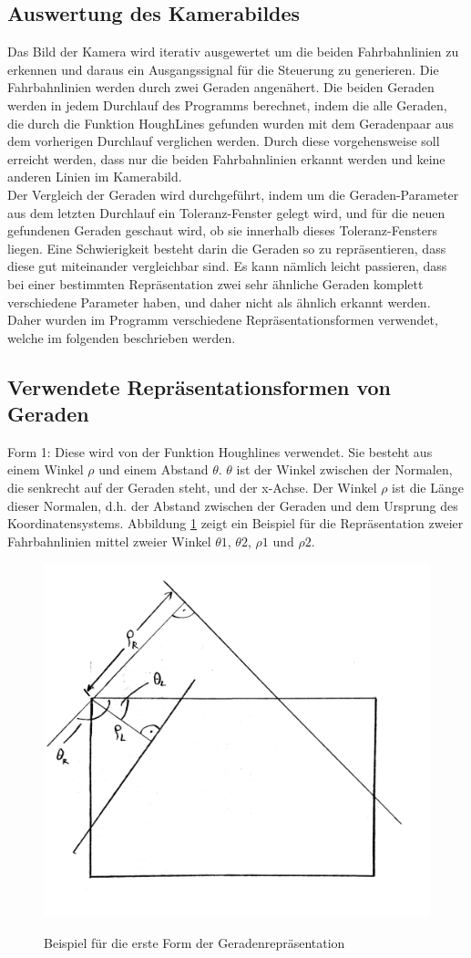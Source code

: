 \documentclass[a4paper,12pt]{article}
\begin{document}
	\subsection{Auswertung des Kamerabildes}	

	Das Bild der Kamera wird iterativ ausgewertet um die beiden Fahrbahnlinien zu erkennen und daraus ein Ausgangssignal für die Steuerung zu generieren. Die Fahrbahnlinien werden durch zwei Geraden angenähert. Die beiden Geraden werden in jedem Durchlauf des Programms berechnet, indem die alle Geraden, die durch die Funktion HoughLines gefunden wurden mit dem Geradenpaar aus dem vorherigen Durchlauf verglichen werden. Durch diese vorgehensweise soll erreicht werden, dass nur die beiden Fahrbahnlinien erkannt werden und keine anderen Linien im Kamerabild. \\
	Der Vergleich der Geraden wird durchgeführt, indem um die Geraden-Parameter aus dem letzten Durchlauf ein Toleranz-Fenster gelegt wird, und für die neuen gefundenen Geraden geschaut wird, ob sie innerhalb dieses Toleranz-Fensters liegen.
	Eine Schwierigkeit besteht darin die Geraden so zu repräsentieren, dass diese gut miteinander vergleichbar sind. Es kann nämlich leicht passieren, dass bei einer bestimmten Repräsentation zwei sehr ähnliche Geraden komplett verschiedene Parameter haben, und daher nicht als ähnlich erkannt werden. Daher wurden im Programm verschiedene Repräsentationsformen verwendet, welche im folgenden beschrieben werden.
	
	\subsection{Verwendete Repräsentationsformen von Geraden}
	
	Form 1: Diese wird von der Funktion Houghlines verwendet. Sie besteht aus einem Winkel $\rho$ und einem Abstand $\theta$. $\theta$ ist der Winkel zwischen der Normalen, die senkrecht auf der Geraden steht, und der x-Achse. Der Winkel  $\rho$ ist die Länge dieser Normalen, d.h. der Abstand zwischen der Geraden und dem Ursprung des Koordinatensystems.
	Abbildung \ref{fig:rho_theta1} zeigt ein Beispiel für die Repräsentation zweier Fahrbahnlinien mittel zweier Winkel $\theta1$, $\theta2$, $\rho1$ und $\rho2$.
	
	\begin{figure}[h!]
		\centering
		\includegraphics[width=.5\linewidth]{images/rho_theta1.jpg}
		\label{fig:rho_theta1}
		\caption{Beispiel für die erste Form der Geradenrepräsentation}
	\end{figure}
	
\end{document}
